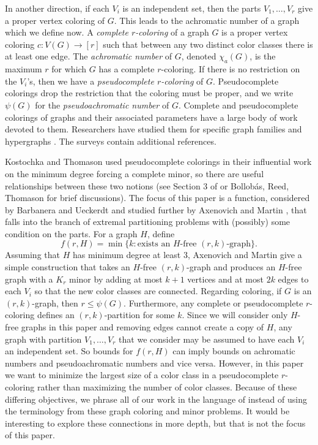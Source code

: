 \documentclass[12pt]{article}%
\begin{document}
In another direction, if each $V_i$ is an independent set, 
then the parts $V_1, \dots , V_r$ give a proper vertex coloring of $G$.  This leads to the achromatic number of a graph which we define now.  A \emph{complete $r$-coloring} of a graph $G$ is a proper vertex coloring $c : V(G) \rightarrow [r]$ such that between any two distinct color classes there is at least one edge.  The {\em achromatic number} of $G$, denoted $\chi_a (G)$, is the maximum $r$ for which $G$ has a complete $r$-coloring.  
If there is no restriction on the $V_i$'s, then we have  
a \emph{pseudocomplete $r$-coloring} of $G$.  Pseudocomplete colorings drop the restriction that the coloring must be proper, and we write 
$\psi (G)$ for the {\em pseudoachromatic number} of $G$.  
Complete and pseudocomplete colorings of graphs and their associated parameters have a large body of work devoted to them. Researchers have studied them for specific graph families
\cite{achromaticCirculant, achromaticJGT, achromaticDM,  achromaticDM2, achromaticJCTB2} and
hypergraphs \cite{completeDM, completeDMhypergraph}.
The surveys \cite{edwardsSurvey, achromaticSurvey} contain additional references.  

Kostochka \cite{Kostochka} and Thomason \cite{Thomason2006} used pseudocomplete colorings in their influential work on the minimum degree forcing a complete minor, so there are useful relationships between these two notions (see Section 3 of \cite{Thomason2006} or Bollob\'{a}s, Reed, Thomason \cite{Bollobas} for brief discussions).  The focus of this paper is a function,
considered by Barbanera and Ueckerdt \cite{Barb} and studied further by Axenovich and Martin \cite{AxeMartin}, that falls into the branch of extremal partitioning problems with (possibly) some condition on the parts.  
For a graph $H$, define
\[
f ( r, H) = \min \{ k : \mbox{exists an $H$-free $(r,k)$-graph} \}.
\]
Assuming that $H$ has minimum degree at least 3, Axenovich and Martin 
give a simple construction that takes an $H$-free $(r,k)$-graph
and produces an $H$-free graph with a $K_r$ minor by adding at most $k+1$ vertices and at most $2k$ edges to each $V_i$ so that the new color classes are connected.  Regarding coloring, if $G$ is an 
$(r,k)$-graph, then $r \leq \psi (G)$.  Furthermore, any 
complete or pseudocomplete $r$-coloring 
defines an $(r,k)$-partition for some $k$. Since we will consider only $H$-free graphs in this  paper and removing edges cannot create a copy of $H$, any graph with partition $V_1,\dots, V_r$ that we consider may be assumed to have each $V_i$ an independent set.
So bounds for $f(r,H)$ can imply bounds on achromatic numbers and pseudoachromatic numbers and vice versa.
However, in this paper we want to minimize the largest size of a color class in a pseudocomplete $r$-coloring rather than maximizing the number of color classes. Because of these differing objectives, we phrase all of our work in the language of \cite{AxeMartin} instead of using the terminology from these graph coloring and minor problems. 
  It would be interesting to explore these connections in more depth, but that is not the focus of this paper.  
\end{document}
